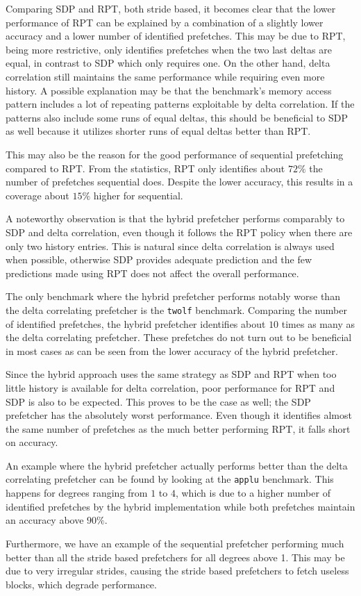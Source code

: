 Comparing SDP and RPT, both stride based, it becomes clear that the lower
performance of RPT can be explained by a combination of a slightly lower
accuracy and a lower number of identified prefetches.
This may be due to RPT, being more restrictive, only identifies prefetches when
the two last deltas are equal, in contrast to SDP which only requires one.
On the other hand, delta correlation still maintains the same performance while
requiring even more history.
A possible explanation may be that the benchmark's memory access pattern
includes a lot of repeating patterns exploitable by delta correlation.
If the patterns also include some runs of equal deltas, this should be
beneficial to SDP as well because it utilizes shorter runs of equal deltas
better than RPT.

This may also be the reason for the good performance of sequential prefetching
compared to RPT.
From the statistics, RPT only identifies about $72\%$ the number of prefetches
sequential does.
Despite the lower accuracy, this results in a coverage about $15\%$ higher for
sequential.

A noteworthy observation is that the hybrid prefetcher performs comparably to
SDP and delta correlation, even though it follows the RPT policy when there are
only two history entries.
This is natural since delta correlation is always used when possible, otherwise
SDP provides adequate prediction and the few predictions made using RPT does not
affect the overall performance.

The only benchmark where the hybrid prefetcher performs notably worse than the
delta correlating prefetcher is the \texttt{twolf} benchmark.
Comparing the number of identified prefetches, the hybrid prefetcher identifies
about $10$ times as many as the delta correlating prefetcher.
These prefetches do not turn out to be beneficial in most cases as can be seen
from the lower accuracy of the hybrid prefetcher.

Since the hybrid approach uses the same strategy as SDP and RPT when too little
history is available for delta correlation, poor performance for RPT and SDP is
also to be expected.
This proves to be the case as well; the SDP prefetcher has the absolutely worst
performance.
Even though it identifies almost the same number of prefetches as the much
better performing RPT, it falls short on accuracy.

An example where the hybrid prefetcher actually performs better than the delta
correlating prefetcher can be found by looking at the \texttt{applu} benchmark.
This happens for degrees ranging from $1$ to $4$, which is due to a higher
number of identified prefetches by the hybrid implementation while both
prefetches maintain an accuracy above $90\%$.

Furthermore, we have an example of the sequential prefetcher performing much
better than all the stride based prefetchers for all degrees above 1.
This may be due to very irregular strides, causing the stride based prefetchers
to fetch useless blocks, which degrade performance.
